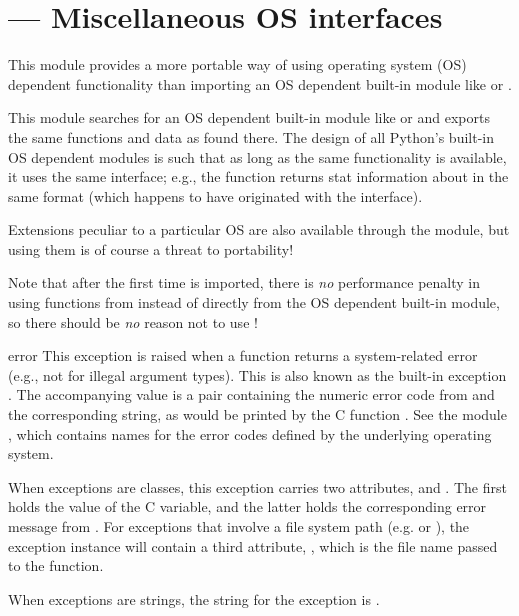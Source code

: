 \section{ ---
         Miscellaneous OS interfaces}



This module provides a more portable way of using operating system
(OS) dependent functionality than importing an OS dependent built-in
module like  or .

This module searches for an OS dependent built-in module like
 or  and exports the same functions and data
as found there.  The design of all Python's built-in OS dependent
modules is such that as long as the same functionality is available,
it uses the same interface; e.g., the function
 returns stat information about  in
the same format (which happens to have originated with the
\POSIX{} interface).

Extensions peculiar to a particular OS are also available through the
 module, but using them is of course a threat to
portability!

Note that after the first time  is imported, there is
\emph{no} performance penalty in using functions from 
instead of directly from the OS dependent built-in module, so there
should be \emph{no} reason not to use !


\begin{excdesc}{error}
This exception is raised when a function returns a
system-related error (e.g., not for illegal argument types).  This is
also known as the built-in exception .  The
accompanying value is a pair containing the numeric error code from
 and the corresponding string, as would be printed by the
C function .  See the module
, which contains names for the
error codes defined by the underlying operating system.

When exceptions are classes, this exception carries two attributes,
 and .  The first holds the value of
the C  variable, and the latter holds the corresponding
error message from .  For exceptions that
involve a file system path (e.g.  or
), the exception instance will contain a third
attribute, , which is the file name passed to the
function.

When exceptions are strings, the string for the exception is
.
\end{excdesc}

